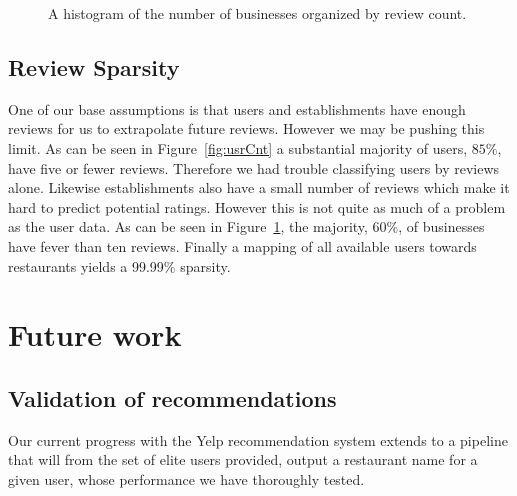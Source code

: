\documentclass[10pt,twocolumn,letterpaper]{article}
\begin{document}
\begin{figure}[t]
\begin{center}
\end{center}
   \caption{A histogram of the number of businesses organized by review count.}
\label{fig:bizCnt}
\end{figure}

\subsection{Review Sparsity}
One of our base assumptions is that users and establishments have enough reviews for us to extrapolate future reviews. However we may be pushing this limit. As can be seen in Figure~\ref{fig:usrCnt} a substantial majority of users, $85\%$, have five or fewer reviews. Therefore we had trouble classifying users by reviews alone. Likewise establishments also have a small number of reviews which make it hard to predict potential ratings. However this is not quite as much of a problem as the user data. As can be seen in Figure~\ref{fig:bizCnt}, the majority, $60\%$, of businesses have fever than ten reviews. Finally a mapping of all available users towards restaurants yields a 99.99\% sparsity\cite{ClassPresentation}.


\section{Future work}

\subsection{Validation of recommendations}
Our current progress with the Yelp recommendation system extends to a pipeline that will from the set of elite users provided, output a restaurant name for a given user, whose performance we have thoroughly tested. 
\end{document}
